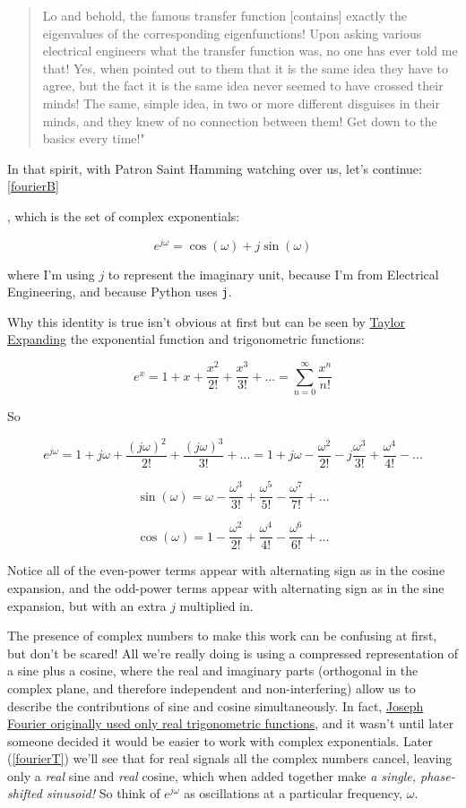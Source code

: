 \documentclass[10pt]{article}
\begin{document}
{\begin{quotation}
Lo and behold, the famous transfer function [contains] exactly the eigenvalues of the corresponding eigenfunctions! Upon asking various electrical engineers what the transfer function was, no one has ever told me that! Yes, when pointed out to them that it is the same idea they have to agree, but the fact it is the same idea never seemed to have crossed their minds! The same, simple idea, in two or more different disguises in their minds, and they knew of no connection between them! Get down to the basics every time!"\end{quotation}

In that spirit, with Patron Saint Hamming watching over us, let's continue: \autoref{fourierB}}, which is the set of complex exponentials:

\begin{equation}\label{euler}
e^{j \omega} = \cos(\omega) + j \sin(\omega)
\end{equation}

where I'm using $j$ to represent the imaginary unit, because I'm from Electrical Engineering, and because Python uses \texttt{j}.\newline

Why this identity is true isn't obvious at first but can be seen by \href{https://math.stackexchange.com/a/492165/278341}{Taylor Expanding}\cite{taylor} the exponential function and trigonometric functions:

$$e^x = 1 + x + \frac{x^2}{2!} + \frac{x^3}{3!} + ... = \sum_{n=0}^{\infty} \frac{x^n}{n!}$$

So

$$ e^{j \omega} = 1 + j \omega + \frac{(j \omega)^2}{2!} + \frac{(j \omega)^3}{3!} + ... = 1 + j \omega - \frac{\omega^2}{2!} - j \frac{\omega^3}{3!} + \frac{\omega^4}{4!} - ... $$

$$ \sin(\omega) = \omega - \frac{\omega^3}{3!} + \frac{\omega^5}{5!} - \frac{\omega^7}{7!} + ... $$

$$ \cos(\omega) = 1 - \frac{\omega^2}{2!} + \frac{\omega^4}{4!} - \frac{\omega^6}{6!} + ... $$

Notice all of the even-power terms appear with alternating sign as in the cosine expansion, and the odd-power terms appear with alternating sign as in the sine expansion, but with an extra $j$ multiplied in.

The presence of complex numbers to make this work can be confusing at first, but don't be scared! All we're really doing is using a compressed representation of a sine plus a cosine, where the real and imaginary parts (orthogonal in the complex plane, and therefore independent and non-interfering) allow us to describe the contributions of sine and cosine simultaneously. In fact, \href{https://math.stackexchange.com/a/1293127/278341}{Joseph Fourier originally used only real trigonometric functions}\cite{complex}, and it wasn't until later someone decided it would be easier to work with complex exponentials. Later (\autoref{fourierT}) we'll see that for real signals all the complex numbers cancel, leaving only a \textit{real} sine and \textit{real} cosine, which when added together make \textit{a single, phase-shifted sinusoid!} So think of $e^{j \omega}$ as oscillations at a particular frequency, $\omega$.
\end{document}
